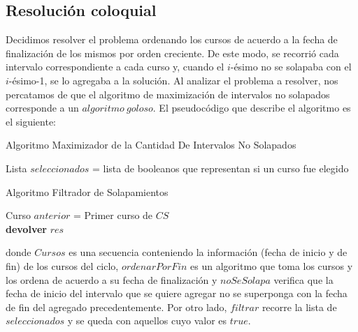 \subsection{Resolución coloquial}

Decidimos resolver el problema ordenando los cursos de acuerdo a la fecha de finalización de los mismos por orden creciente. De este modo, se recorrió cada intervalo correspondiente a cada curso y, cuando el $i$-ésimo no se solapaba con el $i$-ésimo-1, se lo agregaba a la solución.\newline
Al analizar el problema a resolver, nos percatamos de que el algoritmo de maximización de intervalos no solapados corresponde a un $algoritmo\ goloso$. El pseudocódigo que describe el algoritmo es el siguiente:\newline

\begin{algorithm}[H]
    \SetAlgoLined
    \caption{Algoritmo Maximizador de la Cantidad De Intervalos No Solapados}
    Lista $seleccionados$ = lista de booleanos que representan si un curso fue elegido\\
\end{algorithm}

\begin{algorithm}[H]
    \SetAlgoLined
    \caption{Algoritmo Filtrador de Solapamientos}
    Curso $anterior$ = Primer curso de $CS$\\
    \textbf{devolver} $res$\\   
\end{algorithm}


donde $Cursos$ es una secuencia conteniendo la información (fecha de inicio y de fin) de los cursos del ciclo, $ordenarPorFin$ es un algoritmo que toma los cursos y los ordena de acuerdo a su fecha de finalización y $noSeSolapa$ verifica que la fecha de inicio del intervalo que se quiere agregar no se superponga con la fecha de fin del agregado precedentemente. Por otro lado, $filtrar$ recorre la lista de $seleccionados$ y se queda con aquellos cuyo valor es $true$.

